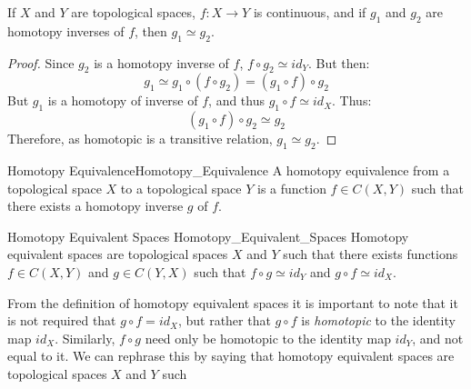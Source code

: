             \begin{theorem}
                If $X$ and $Y$ are topological spaces, $f:X\rightarrow{Y}$ is
                continuous, and if $g_{1}$ and $g_{2}$ are homotopy inverses
                of $f$, then $g_{1}\simeq{g}_{2}$.
            \end{theorem}
            \begin{proof}
                Since $g_{2}$ is a homotopy inverse of $f$,
                $f\circ{g}_{2}\simeq{id}_{Y}$. But then:
                \begin{equation}
                    g_{1}\simeq{g}_{1}\circ(f\circ{g}_{2})
                    =(g_{1}\circ{f})\circ{g}_{2}
                \end{equation}
                But $g_{1}$ is a homotopy of inverse of $f$,
                and thus $g_{1}\circ{f}\simeq{id}_{X}$. Thus:
                \begin{equation}
                    (g_{1}\circ{f})\circ{g}_{2}\simeq{g}_{2}
                \end{equation}
                Therefore, as homotopic is a transitive relation,
                $g_{1}\simeq{g}_{2}$.
            \end{proof}
            \begin{ldefinition}{Homotopy Equivalence}{Homotopy_Equivalence}
                A homotopy equivalence from a topological space $X$ to a
                topological space $Y$ is a function $f\in{C}(X,Y)$ such that
                there exists a homotopy inverse $g$ of $f$.
            \end{ldefinition}
            \begin{ldefinition}{Homotopy Equivalent Spaces}
                               {Homotopy_Equivalent_Spaces}
                Homotopy equivalent spaces are topological spaces $X$ and $Y$
                such that there exists functions ${f}\in{C(X,Y)}$ and
                ${g}\in{C(Y,X)}$ such that ${f}\circ{g}\simeq{id_{Y}}$
                and ${g}\circ{f}\simeq{id_{X}}$.
            \end{ldefinition}
            From the definition of homotopy equivalent spaces it is important
            to note that it is not required that $g\circ{f}=id_{X}$, but rather
            that $g\circ{f}$ is \textit{homotopic} to the identity map $id_{X}$.
            Similarly, $f\circ{g}$ need only be homotopic to the identity map
            $id_{Y}$, and not equal to it. We can rephrase this by saying that
            homotopy equivalent spaces are topological spaces $X$ and $Y$ such
